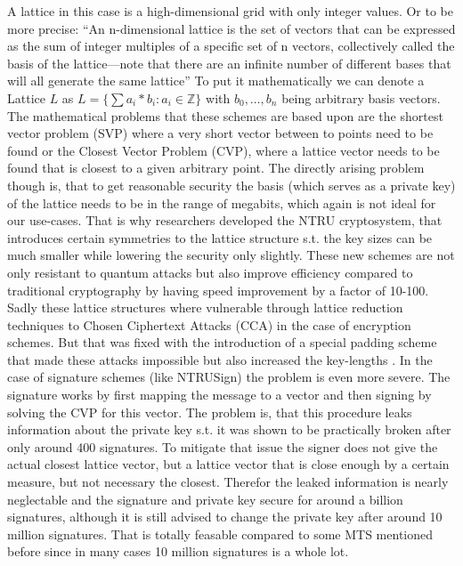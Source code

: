 \documentclass[conference]{IEEEtran}
\begin{document}
A lattice in this case is a high-dimensional grid with only integer values. Or to be more precise: ``An n-dimensional lattice is the set of vectors that can be
expressed as the sum of integer multiples of a specific set of n
vectors, collectively called the basis of the lattice—note that
there are an infinite number of different bases that will all
generate the same lattice'' \cite{QR_algs}
To put it mathematically we can denote a Lattice $L$ as $L=\{\sum a_i*b_i : a_i \in \mathbb{Z}\}$ with $b_0,\dots,b_n$ being arbitrary basis vectors.
The mathematical problems that these schemes are based upon are the shortest vector problem (SVP) where a very short vector between to points need to be found or the Closest Vector Problem (CVP), where a lattice vector needs to be found that is closest to a given arbitrary point.
The directly arising problem though is, that to get reasonable security the basis (which serves as a private key) of the lattice needs to be in the range of megabits, which again is not ideal for our use-cases. That is why researchers developed the NTRU cryptosystem, that introduces certain symmetries to the lattice structure s.t. the key sizes can be much smaller while lowering the security only slightly.\cite{QR_algs,QR_comparison}
These new schemes are not only resistant to quantum attacks but also improve efficiency compared to traditional cryptography by having speed improvement by a factor of 10-100.
Sadly these lattice structures where vulnerable through lattice reduction techniques to Chosen Ciphertext Attacks (CCA) in the case of encryption schemes. But that was fixed with the introduction of a special padding scheme that made these attacks impossible but also increased the key-lengths \cite{QR_algs} .
In the case of signature schemes (like NTRUSign) the problem is even more severe.
The signature works by first mapping the message to a vector and then signing by solving the CVP for this vector. The problem is, that this procedure leaks information about the private key s.t. it was shown to be practically broken after only around 400 signatures.  To mitigate that issue the signer does not give the actual closest lattice vector, but a lattice vector that is close enough by a certain measure, but not necessary the closest. Therefor the leaked information is nearly neglectable and the signature and private key secure for around a billion signatures, although it is still advised to change the private key after around 10 million signatures. 
That is totally feasable compared to some MTS mentioned before since in many cases 10 million signatures is a whole lot.
\end{document}
